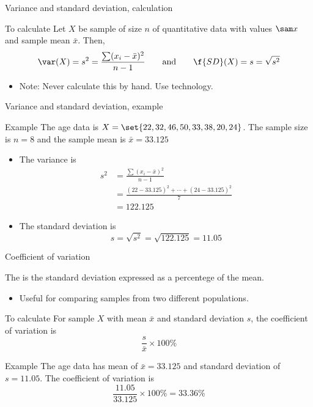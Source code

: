 \documentclass[xcolor=table, handout]{beamer}
\begin{document}
\begin{frame}{Variance and standard deviation, calculation}
\begin{exampleblock}{To calculate}
Let $X$ be sample of size $n$ of quantitative data with values $\sam x$ and sample mean $\bar x$. Then,
\[\var(X) = s^2 = \frac{\sum (x_i - \bar x)^2}{n-1} \qquad \text{and} \qquad  \f{SD}(X) = s = \sqrt{s^2}\]
\begin{itemize}
\item Note: Never calculate this by hand. Use technology.
\end{itemize}
\end{exampleblock}
\end{frame}

\begin{frame}{Variance and standard deviation, example}
\begin{exampleblock}{Example}
The age data is $X = \set{22, 32, 46, 50, 33, 38, 20, 24}$. The sample size is $n=8$ and the sample mean is $\bar x = 33.125$
\begin{itemize}
\pause
\item The variance is 
\begin{align*}
s^2 &= \frac{\sum (x_i - \bar x)^2}{n-1}\\
&= \frac{(22-33.125)^2 + \cdots + (24-33.125)^2}{7}\\
&= 122.125 
\end{align*}
\pause
\item The standard deviation is
\[s = \sqrt{s^2} = \sqrt{122.125} = 11.05\]
\end{itemize}
\smallskip
\end{exampleblock}
\end{frame}

\begin{frame}{Coefficient of variation}
\begin{block}{}
The  is the standard deviation expressed as a percentege of the mean.
\begin{itemize}
\item Useful for comparing samples from two different populations.
\end{itemize}
\end{block}

\pause
\begin{exampleblock}{To calculate}
For sample $X$ with mean $\bar x$ and standard deviation $s$, the coefficient of variation is
\[\frac s {\bar x} \times 100\%\]
\end{exampleblock}

\pause
\begin{exampleblock}{Example}
The age data has mean of $\bar x = 33.125$ and standard deviation of $s=11.05$. The coefficient of variation is 
\[\frac {11.05}{33.125} \times 100\% = 33.36\%\]
\end{exampleblock}
\end{frame}
\end{document}
